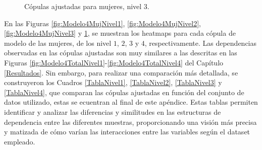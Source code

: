 \begin{figure}[H]
 \centering
    \caption{Cópulas ajustadas para mujeres, nivel $3$.}
    \label{fig:Modelo4MujNivel4}
\end{figure}


En las Figuras \ref{fig:Modelo4MujNivel1}, \ref{fig:Modelo4MujNivel2}, \ref{fig:Modelo4MujNivel3} y \ref{fig:Modelo4MujNivel4}, se muestran los heatmaps para cada cópula de modelo de las mujeres, de los nivel $1$, $2$, $3$ y $4$, respectivamente. Las dependencias observadas en las cópulas ajustadas son muy similares a las descritas en las Figuras \ref{fig:Modelo4TotalNivel1}-\ref{fig:Modelo4TotalNivel4} del Capítulo \ref{Resultados}. Sin embargo, para realizar una comparación más detallada, se construyeron los Cuadros \ref{TablaNivel1}, \ref{TablaNivel2}, \ref{TablaNivel3} y \ref{TablaNivel4}, que comparan las cópulas ajustadas en función del conjunto de datos utilizado, estas se ecuentran al final de este apéndice. Estas tablas permiten identificar y analizar las diferencias y similitudes en las estructuras de dependencia entre las diferentes muestras, proporcionando una visión más precisa y matizada de cómo varían las interacciones entre las variables según el dataset empleado.

